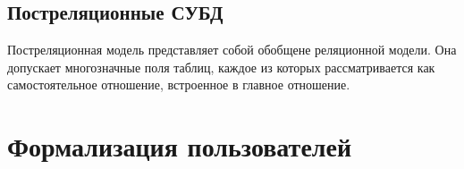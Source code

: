 \subsection*{Постреляционные СУБД}

Постреляционная модель представляет собой обобщене реляционной модели. Она допускает многозначные поля таблиц, каждое из которых рассматривается как самостоятельное отношение, встроенное в главное отношение. 

%
%	
%
%	

\section{Формализация пользователей}

